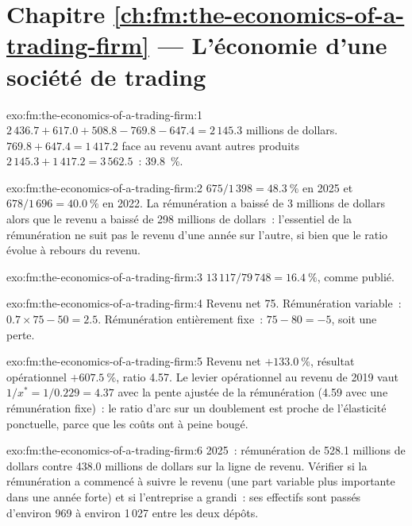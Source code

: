 \section*{Chapitre \ref{ch:fm:the-economics-of-a-trading-firm} --- L'économie d'une société de trading}

\begin{solution}{exo:fm:the-economics-of-a-trading-firm:1}
$2\,436.7+617.0+508.8-769.8-647.4=2\,145.3$ millions de dollars.  $769.8+647.4=1\,417.2$ face au revenu avant autres produits
$2\,145.3+1\,417.2=3\,562.5$~: 39.8~\%.
\end{solution}

\begin{solution}{exo:fm:the-economics-of-a-trading-firm:2}
$675/1\,398=48.3~\%$ en 2025 et $678/1\,696=40.0~\%$ en 2022. La rémunération a baissé de 3 millions de dollars alors que le revenu a baissé de 298 millions de dollars~: l'essentiel de la rémunération ne suit pas
le revenu d'une année sur l'autre, si bien que le ratio évolue à rebours du revenu.
\end{solution}

\begin{solution}{exo:fm:the-economics-of-a-trading-firm:3}
$13\,117/79\,748=16.4~\%$, comme publié.
\end{solution}

\begin{solution}{exo:fm:the-economics-of-a-trading-firm:4}
Revenu net 75. Rémunération variable~: $0.7\times75-50=2.5$. Rémunération entièrement fixe~: $75-80=-5$, soit une perte.
\end{solution}

\begin{solution}{exo:fm:the-economics-of-a-trading-firm:5}
Revenu net $+133.0~\%$, résultat opérationnel $+607.5~\%$, ratio 4.57. Le levier opérationnel au revenu de 2019 vaut $1/x^\ast=1/0.229=4.37$ avec la
pente ajustée de la rémunération (4.59 avec une rémunération fixe)~: le ratio d'arc sur un doublement est proche de l'élasticité ponctuelle, parce que les coûts ont à peine bougé.
\end{solution}

\begin{solution}{exo:fm:the-economics-of-a-trading-firm:6}
2025~: rémunération de 528.1 millions de dollars contre 438.0 millions de dollars sur la ligne de revenu. Vérifier si la rémunération a commencé à suivre le revenu (une part variable plus importante dans une année forte)
et si l'entreprise a grandi~: ses effectifs sont passés d'environ 969 à environ 1\,027 entre les deux dépôts.
\end{solution}

